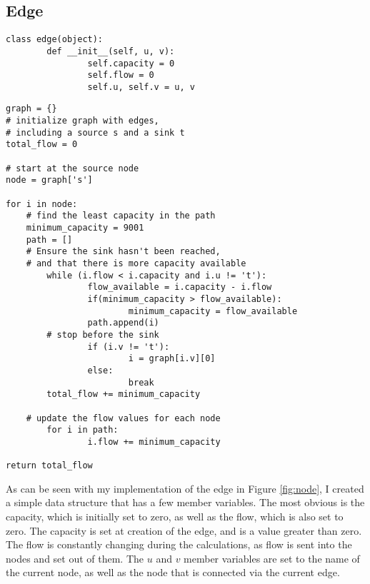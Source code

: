 \documentclass[conference]{IEEEtran}
\begin{document}
\subsection{Edge}
\begin{figure*}[t]
\begin{lstlisting}
class edge(object):
        def __init__(self, u, v):
                self.capacity = 0
                self.flow = 0
                self.u, self.v = u, v
\end{lstlisting}
\caption{Node Class in Python}\label{fig:node}
\end{figure*}

\begin{figure*}[t]
\begin{lstlisting}
graph = {}
# initialize graph with edges,
# including a source s and a sink t
total_flow = 0

# start at the source node
node = graph['s']

for i in node:
	# find the least capacity in the path
	minimum_capacity = 9001
	path = []
	# Ensure the sink hasn't been reached,
	# and that there is more capacity available
        while (i.flow < i.capacity and i.u != 't'):
                flow_available = i.capacity - i.flow
                if(minimum_capacity > flow_available):
                        minimum_capacity = flow_available
                path.append(i)
		# stop before the sink
                if (i.v != 't'):
                        i = graph[i.v][0]
                else:
                        break
        total_flow += minimum_capacity

	# update the flow values for each node
        for i in path:
                i.flow += minimum_capacity

return total_flow
\end{lstlisting}
\caption{Ford Fulkerson Algorithm in Python}\label{fig:algo}
\end{figure*}

As can be seen with my implementation of the edge in Figure \ref{fig:node}, I created a simple data structure that has a few member variables. The most obvious is the capacity, which is initially set to zero, as well as the flow, which is also set to zero. The capacity is set at creation of the edge, and is a value greater than zero. The flow is constantly changing during the calculations, as flow is sent into the nodes and set out of them. The $u$ and $v$ member variables are set to the name of the current node, as well as the node that is connected via the current edge. 
\end{document}

